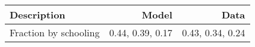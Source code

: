 \begin{tabular}{lrr}
\hline
Description & Model  & Data  \\
\hline
Fraction by schooling & 0.44, 0.39, 0.17  & 0.43, 0.34, 0.24  \\
\hline
\end{tabular}%
